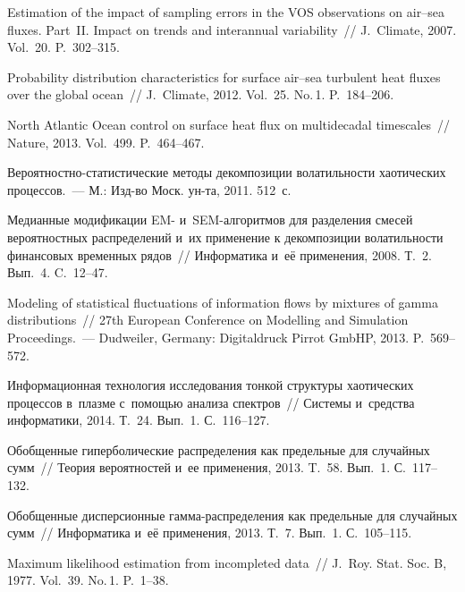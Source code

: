 \begin{multicols}{2}
{{\begin{thebibliography}{99}
 Estimation
of the impact of sampling errors in the VOS observations on air--sea
fluxes. Part~II. Impact on trends and interannual variability~//
J.~Climate, 2007. Vol.~20. P.~302--315.

 Probability
distribution characteristics for surface air--sea turbulent heat
fluxes over the global ocean~// J.~Climate, 2012. Vol.~25.
No.\,1. P.~184--206.

 North Atlantic Ocean control on surface
heat flux on multidecadal timescales~// Nature, 2013. Vol.~499.
P.~464--467.

Ве\-ро\-ят\-но\-ст\-но-ста\-ти\-сти\-че\-ские методы декомпозиции волатильности
хаотических процессов.~--- М.: Изд-во Моск. ун-та, 2011. 512~с.

 Медианные  модификации EM- и~SEM-ал\-го\-рит\-мов
для разделения смесей вероятностных распределений и~их
применение к декомпозиции волатильности финансовых временных
рядов~// Информатика и~её применения, 2008. Т.~2. Вып.~4. C.~12--47.

Modeling of statistical fluctuations of information flows by
mixtures of gamma distributions~// 27th European
Conference on Modelling and Simulation Proceedings.~--- Dudweiler, Germany:
Digitaldruck Pirrot GmbHP, 2013. P.~569--572.

 Информационная
технология исследования тонкой структуры хаотических процессов 
в~плазме с~помощью анализа спектров~// Системы и~средства
информатики, 2014. Т.~24. Вып.~1. С.~116--127.

 Обобщенные
гиперболические распределения как предельные для случайных сумм~// 
Теория вероятностей и~ее применения, 2013. T.~58. Вып.~1.
С.~117--132.

Обобщенные дисперсионные гам\-ма-рас\-пре\-де\-ле\-ния как предельные для
случайных сумм~// Информатика и~её применения, 2013. Т.~7. Вып.~1.
С.~105--115.

Maximum likelihood estimation from incompleted data~// J.~Roy. 
Stat. Soc. B, 1977. Vol.~39. No.\,1. P.~1--38.
 \end{thebibliography}

 }
 }

\end{multicols}


